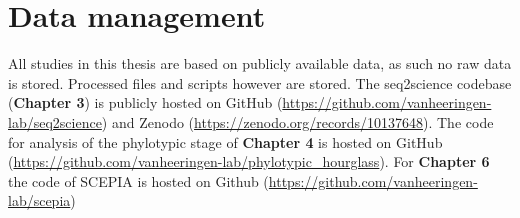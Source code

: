 \section{Data management}

All studies in this thesis are based on publicly available data, as such no raw data is stored. Processed files and scripts however are stored. The seq2science codebase (\textbf{Chapter 3}) is publicly hosted on GitHub (\url{https://github.com/vanheeringen-lab/seq2science}) and Zenodo (\url{https://zenodo.org/records/10137648}). The code for analysis of the phylotypic stage of \textbf{Chapter 4} is hosted on GitHub (\url{https://github.com/vanheeringen-lab/phylotypic_hourglass}). For \textbf{Chapter 6} the code of SCEPIA is hosted on Github (\url{https://github.com/vanheeringen-lab/scepia})
